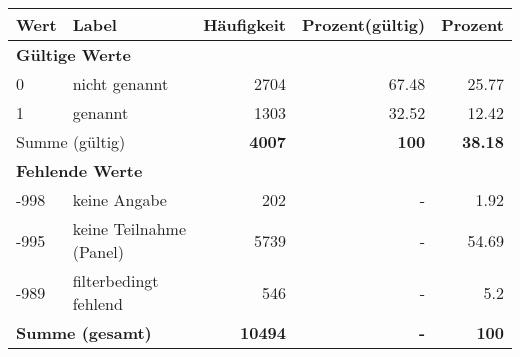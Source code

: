      \begin{longtable}{lXrrr}
     \toprule
     \textbf{Wert} & \textbf{Label} & \textbf{Häufigkeit} & \textbf{Prozent(gültig)} & \textbf{Prozent} \\
     \endhead
     \midrule
     \multicolumn{5}{l}{\textbf{Gültige Werte}}\\

     0 &
     \multicolumn{1}{X}{ nicht genannt   } &


       \num{2704} &
       \num[round-mode=places,round-precision=2]{67.48} &
         \num[round-mode=places,round-precision=2]{25.77} \\

     1 &
     \multicolumn{1}{X}{ genannt   } &


       \num{1303} &
       \num[round-mode=places,round-precision=2]{32.52} &
         \num[round-mode=places,round-precision=2]{12.42} \\
     \midrule
     \multicolumn{2}{l}{Summe (gültig)} &
       \textbf{\num{4007}} &
     \textbf{\num{100}} &
       \textbf{\num[round-mode=places,round-precision=2]{38.18}} \\
     \multicolumn{5}{l}{\textbf{Fehlende Werte}}\\
       -998 &
       keine Angabe &
         \num{202} &
        - &
         \num[round-mode=places,round-precision=2]{1.92} \\
       -995 &
       keine Teilnahme (Panel) &
         \num{5739} &
        - &
         \num[round-mode=places,round-precision=2]{54.69} \\
       -989 &
       filterbedingt fehlend &
         \num{546} &
        - &
         \num[round-mode=places,round-precision=2]{5.2} \\
     \midrule
     \multicolumn{2}{l}{\textbf{Summe (gesamt)}} &
          \textbf{\num{10494}} &
        \textbf{-} &
        \textbf{\num{100}} \\
     \bottomrule
     \end{longtable}
     

